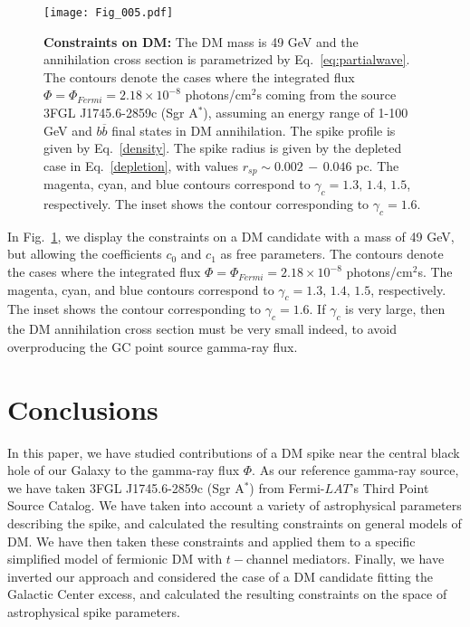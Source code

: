 \documentclass[11pt]{article}
\begin{document}
 






   \begin{figure}[ht]
  \centering
  {\texttt{[image: Fig\_005.pdf]}}
    \caption{\textbf{Constraints on DM:} The DM mass is 49 GeV and the annihilation cross section is parametrized by Eq.~\ref{eq:partialwave}. The contours denote the cases where the integrated flux $\Phi =  \Phi_{Fermi} = 2.18 \times 10^{-8}$ photons/cm$^2$s coming from the source 3FGL J1745.6-2859c (Sgr A$^*$), assuming an energy range of 1-100 GeV and $b \overline{b}$ final states in DM annihilation.   The spike profile is given by Eq.~\ref{density}. The spike radius is given by the depleted case in Eq.~\ref{depletion}, with values $r_{sp} \sim 0.002 \, - \, 0.046$ pc. The magenta, cyan, and blue contours correspond to $\gamma_c = 1.3, \, 1.4, \, 1.5$, respectively. The inset shows the contour corresponding to $\gamma_c = 1.6$. }
    \label{GCfluxc0c1plane}
\end{figure}

In Fig.~\ref{GCfluxc0c1plane}, we display the constraints on a DM candidate with a mass of 49 GeV, but allowing the coefficients $c_0$ and $c_1$ as free parameters. The contours denote the cases where the integrated flux $\Phi =  \Phi_{Fermi} = 2.18 \times 10^{-8}$ photons/cm$^2$s.  The magenta, cyan, and blue contours correspond to $\gamma_c = 1.3, \, 1.4, \, 1.5$, respectively. The inset shows the contour corresponding to $\gamma_c = 1.6$.  If $\gamma_c$ is very large, then the DM annihilation cross section must be very small indeed, to avoid overproducing the GC point source gamma-ray flux.



\section{Conclusions}

In this paper, we have studied contributions of a DM spike near the central black hole of our Galaxy to the gamma-ray flux $\Phi$. As our reference gamma-ray source, we have taken 3FGL J1745.6-2859c (Sgr A$^*$) from Fermi-$LAT$'s Third Point Source Catalog. We have taken into account a variety of astrophysical parameters describing the spike, and calculated the resulting constraints on general models of DM. We have then taken these constraints and applied them to a specific simplified model of fermionic DM with $t-$channel mediators. Finally, we have inverted our approach and considered the case of a DM candidate fitting the Galactic Center excess, and calculated the resulting constraints on the space of astrophysical spike parameters. 
\end{document}
